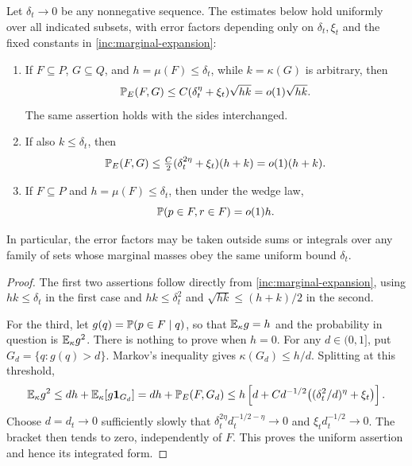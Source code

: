 \begin{lemma}\label{inc:rare}
Let \(\delta_t\to0\) be any nonnegative sequence. The estimates below
hold uniformly over all indicated subsets, with error factors depending
only on \(\delta_t,\xi_t\) and the fixed constants in
\eqref{inc:marginal-expansion}:
\begin{enumerate}[label=\textup{(\roman*)}]
\item If \(F\subseteq P\), \(G\subseteq Q\), and
\(h=\mu(F)\le\delta_t\), while \(k=\kappa(G)\) is arbitrary, then
\begin{equation}\label{inc:one-small-set}
 \mathbb P_E(F,G)\le C(\delta_t^\eta+\xi_t)\sqrt{hk}
                 =o(1)\sqrt{hk}.
\end{equation}
The same assertion holds with the sides interchanged.
\item If also \(k\le\delta_t\), then
\begin{equation}\label{inc:joint-rare-edge}
 \mathbb P_E(F,G)\le\tfrac C2(\delta_t^{2\eta}+\xi_t)(h+k)
                 =o(1)(h+k).
\end{equation}
\item If \(F\subseteq P\) and \(h=\mu(F)\le\delta_t\), then
under the wedge law,
\begin{equation}\label{inc:joint-rare-wedge}
 \mathbb P(p\in F,r\in F)=o(1)h.
\end{equation}
\end{enumerate}
In particular, the error factors may be taken outside sums or integrals
over any family of sets whose marginal masses obey the same uniform
bound \(\delta_t\).
\end{lemma}

\begin{proof}
The first two assertions follow directly from
\eqref{inc:marginal-expansion}, using \(hk\le\delta_t\) in the
first case and \(hk\le\delta_t^2\) and
\(\sqrt{hk}\le(h+k)/2\) in the second.

For the third, let \(g(q)=\mathbb P(p\in F\mid q)\), so that
\(\mathbb E_\kappa g=h\) and the probability in question is
\(\mathbb E_\kappa g^2\). There is nothing to prove when \(h=0\).
For any \(d\in(0,1]\), put \(G_d=\{q:g(q)>d\}\). Markov's
inequality gives \(\kappa(G_d)\le h/d\). Splitting at this threshold,
\[
 \mathbb E_\kappa g^2
 \le dh+\mathbb E_\kappa[g\mathbf 1_{G_d}]
 =dh+\mathbb P_E(F,G_d)
 \le h\left[d+C d^{-1/2}
                  \bigl((\delta_t^2/d)^\eta+\xi_t\bigr)\right].
\]
Choose \(d=d_t\to0\) sufficiently slowly that
\(\delta_t^{2\eta}d_t^{-1/2-\eta}\to0\) and
\(\xi_t d_t^{-1/2}\to0\). The bracket then tends to zero,
independently of \(F\). This proves the uniform assertion and hence
its integrated form.
\end{proof}

